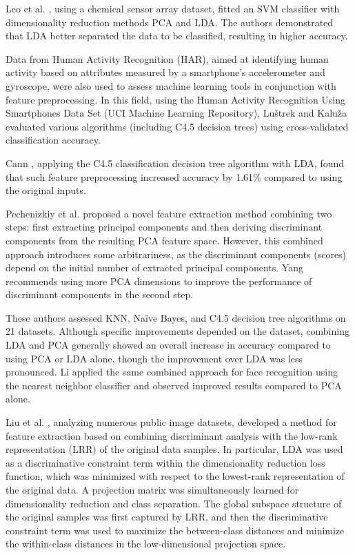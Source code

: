 \documentclass[11pt,a4paper]{article}
\begin{document}
Leo et al. \citep{leo2014efficient}, using a chemical sensor array dataset, fitted an SVM classifier with dimensionality reduction methods PCA and LDA. The authors demonstrated that LDA better separated the data to be classified, resulting in higher accuracy.

Data from Human Activity Recognition (HAR), aimed at identifying human activity based on attributes measured by a smartphone's accelerometer and gyroscope, were also used to assess machine learning tools in conjunction with feature preprocessing.  
In this field, using the Human Activity Recognition Using Smartphones Data Set (UCI Machine Learning Repository), Luštrek and Kaluža \citep{luvstrek2009fall} evaluated various algorithms (including C4.5 decision trees) using cross-validated classification accuracy.

Cann \citep{cannfeature}, applying the C4.5 classification decision tree algorithm with LDA, found that such feature preprocessing increased accuracy by 1.61\% compared to using the original inputs.

Pechenizkiy et al. \citep{pechenizkiy2006combining} proposed a novel feature extraction method combining two steps: first extracting principal components and then deriving discriminant components from the resulting PCA feature space.  
However, this combined approach introduces some arbitrariness, as the discriminant components (scores) depend on the initial number of extracted principal components.  
Yang \citep{yang2003can} recommends using more PCA dimensions to improve the performance of discriminant components in the second step.

These authors assessed KNN, Naïve Bayes, and C4.5 decision tree algorithms on 21 datasets.  
Although specific improvements depended on the dataset, combining LDA and PCA generally showed an overall increase in accuracy compared to using PCA or LDA alone, though the improvement over LDA was less pronounced.  
Li \citep{li2009face} applied the same combined approach for face recognition using the nearest neighbor classifier and observed improved results compared to PCA alone.

Liu et al. \citep{liu2019discriminative}, analyzing numerous public image datasets, developed a method for feature extraction based on combining discriminant analysis with the low-rank representation (LRR) of the original data samples.  
In particular, LDA was used as a discriminative constraint term within the dimensionality reduction loss function, which was minimized with respect to the lowest-rank representation of the original data.  
A projection matrix was simultaneously learned for dimensionality reduction and class separation.  
The global subspace structure of the original samples was first captured by LRR, and then the discriminative constraint term was used to maximize the between-class distances and minimize the within-class distances in the low-dimensional projection space.
\end{document}
